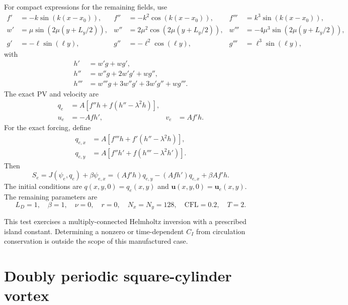 \documentclass[11pt]{article}
\begin{document}
For compact expressions for the remaining fields, use
\begin{align}
  f'&=-k\sin(k(x-x_0)),
  &f''&=-k^2\cos(k(x-x_0)),
  &f'''&=k^3\sin(k(x-x_0)),\\
  w'&=\mu\sin(2\mu(y+L_y/2)),
  &w''&=2\mu^2\cos(2\mu(y+L_y/2)),
  &w'''&=-4\mu^3\sin(2\mu(y+L_y/2)),\\
  g'&=-\ell\sin(\ell y),
  &g''&=-\ell^2\cos(\ell y),
  &g'''&=\ell^3\sin(\ell y),
\end{align}
with
\begin{align}
  h' &= w'g+wg',\\
  h''&=w''g+2w'g'+wg'',\\
  h'''&=w'''g+3w''g'+3w'g''+wg'''.
\end{align}
The exact PV and velocity are
\begin{align}
  q_e &= A\left[f''h+f(h''-\lambda^2h)\right],
    \label{eq:channel-q}\\
  u_e &=-Af h',
  &v_e&=Af'h.
  \label{eq:channel-velocity}
\end{align}
For the exact forcing, define
\begin{align}
  q_{e,x}
    &=A\left[f'''h+f'(h''-\lambda^2h)\right],\\
  q_{e,y}
    &=A\left[f''h'+f(h'''-\lambda^2h')\right].
\end{align}
Then
\begin{equation}
  S_e
  =J(\psi_e,q_e)+\beta\psi_{e,x}
  =(Af'h)q_{e,y}-(Af h')q_{e,x}+\beta Af'h.
  \label{eq:channel-source}
\end{equation}
The initial conditions are $q(x,y,0)=q_e(x,y)$ and
$\boldsymbol{u}(x,y,0)=\boldsymbol{u}_e(x,y)$.  The remaining parameters are
\begin{equation}
  L_D=1,\quad \beta=1,\quad \nu=0,\quad r=0,\quad
  N_x=N_y=128,\quad \mathrm{CFL}=0.2,\quad T=2.
\end{equation}

This test exercises a multiply-connected Helmholtz inversion with a
prescribed island constant.  Determining a nonzero or time-dependent $C_I$
from circulation conservation is outside the scope of this manufactured
case.

\section{Doubly periodic square-cylinder vortex}
\label{sec:periodic-cylinder}
\end{document}

